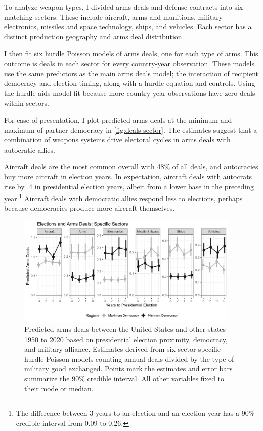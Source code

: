 \documentclass[12pt]{article}
\begin{document}
To analyze weapon types, I divided arms deals and defense contracts into six matching sectors. 
These include aircraft, arms and munitions, military electronics, missiles and space technology, ships, and vehicles.  
Each sector has a distinct production geography and arms deal distribution.


I then fit six hurdle Poisson models of arms deals, one for each type of arms. 
This outcome is deals in each sector for every country-year observation. 
These models use the same predictors as the main arms deals model; the interaction of recipient democracy and election timing, along with a hurdle equation and controls.
Using the hurdle aids model fit because more country-year observations have zero deals within sectors. 


For ease of presentation, I plot predicted arms deals at the minimum and maximum of partner democracy in \autoref{fig:deals-sector}.
The estimates suggest that a combination of weapons systems drive electoral cycles in arms deals with autocratic allies.  


Aircraft deals are the most common overall with 48\% of all deals, and autocracies buy more aircraft in election years.
In expectation, aircraft deals with autocrats rise by .4 in presidential election years, albeit from a lower base in the preceding year.\footnote{The difference between 3 years to an election and an election year has a 90\% credible interval from 0.09 to 0.26.}
Aircraft deals with democratic allies respond less to elections, perhaps because democracies produce more aircraft themselves. 


\begin{figure}[htpb]
	\centering
		\includegraphics[width=0.95\textwidth]{../figures/deals-sector.png}
	\caption{Predicted arms deals between the United States and other states 1950 to 2020 based on presidential election proximity, democracy, and military alliance. Estimates derived from six sector-specific hurdle Poisson models counting annual deals divided by the type of military good exchanged. Points mark the estimates and error bars summarize the 90\% credible interval. All other variables fixed to their mode or median.}
	\label{fig:deals-sector}
\end{figure}
\end{document}
